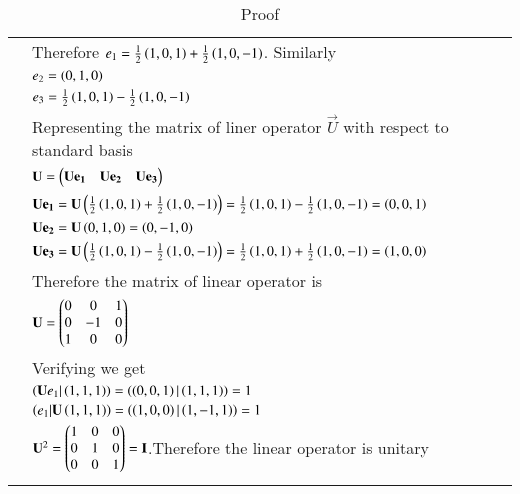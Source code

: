 \documentclass[journal,12pt]{IEEEtran}
\begin{document}
\begin{longtable}{|l|l|}
    & Therefore $e_1=\frac{1}{2}\left(1,0,1\right)+\frac{1}{2}\left(1,0,-1\right)$. Similarly\\
    &$e_2=\left(0,1,0\right)$\\
    &$e_3=\frac{1}{2}\left(1,0,1\right)-\frac{1}{2}\left(1,0,-1\right)$\\
    &Representing the matrix of liner operator $\vec{U}$ with respect to standard basis\\
    &$\mathbf{U}=\begin{pmatrix}\mathbf{Ue_1}&\mathbf{Ue_2}&\mathbf{Ue_3}\end{pmatrix}$\\
    &$\mathbf{Ue_1}=\mathbf{U}\left(\frac{1}{2}\left(1,0,1\right)+\frac{1}{2}\left(1,0,-1\right)\right)={\frac{1}{2}\left(1,0,1\right)-\frac{1}{2}\left(1,0,-1\right)}=\left(0,0,1\right)$\\
    \hline
    &$\mathbf{Ue_2}=\mathbf{U}\left(0,1,0\right)=\left(0,-1,0\right)$\\
    &$\mathbf{Ue_3}=\mathbf{U}\left(\frac{1}{2}\left(1,0,1\right)-\frac{1}{2}\left(1,0,-1\right)\right)=\frac{1}{2}\left(1,0,1\right)+\frac{1}{2}\left(1,0,-1\right)=\left(1,0,0\right)$\\
    &Therefore the matrix of linear operator is \\
    &\qquad\qquad$\mathbf{U}=\begin{pmatrix}0&0&1\\0&-1&0\\1&0&0\end{pmatrix}$\\
    &Verifying we get\\
    &$\left(\mathbf{U}e_1\vert \left(1,1,1\right)\right)=\left(\left(0,0,1\right)\vert\left(1,1,1\right)\right)=1$\\
    &$\left(e_1\vert \mathbf{U}\left(1,1,1\right)\right)=\left(\left(1,0,0\right)\vert\left(1,-1,1\right)\right)=1$\\
    &$\mathbf{U}^2=\begin{pmatrix}1&0&0\\0&1&0\\0&0&1\end{pmatrix}=\mathbf{I}$.Therefore the linear operator is unitary\\
    \hline
    \caption{Proof}
    \label{tab:Cons}
\end{longtable}
\end{document}

